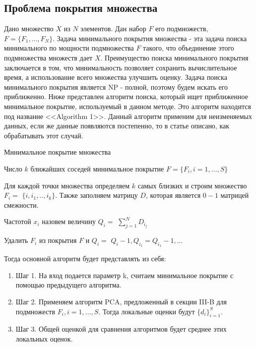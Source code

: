 \documentclass[english, russian]{sobraep}
\begin{document}
\subsection{Проблема покрытия множества}

Дано множество $X$ из $N$ элементов. Дан набор $F$ его подмножеств, $F = \{F_1, ..., F_N\}$. Задача минимального покрытия множества - эта задача поиска минимального по мощности подмножества $F$ такого, что объединение этого подмножества множеств дает $X$.
Преимущество поиска минимального покрытия заключается в том, что минимальность позволяет сохранить вычислительное время, а использование всего множества улучшить оценку. Задача поиска минимального покрытия является NP - полной, поэтому будем искать его приближенно. 
Ниже представлен алгоритм поиска, который ищет приближенное минимальное покрытие, используемый в данном методе. Это алгоритм находится под название <<Algorithm 1>>. Данный алгоритм применим для неизменяемых данных, если же данные появляются постепенно, то в статье описано, как обрабатывать этот случай. 

\begin{algorithm}
\caption{Минимальное покрытие множества}\label{alg:cap}
\begin{algorithmic}
\Require Число $k$ ближайших соседей
\Ensure минимальное покрытие $F = \{F_i, i = 1, ..., S\}$

    \State Для каждой точки множества определяем $k$ 
    \State самых близких и строим множество $F_i =$ 
    \State $\{i, i_1, .., i_k\}$.  Также заполняем 
    \State матрицу $D$, которая является $0-1$ матрицей
    \State смежности.
\EndFor

    \State Частотой $x_i$ назовем величину $Q_i = $
    \State $\sum_{j=1}^N D_i_j$
\EndFor

        \State Удалить $F_i$ из покрытия $F$ и $Q_i = $
        \State $Q_i - 1, Q_i_1 = Q_i_1 - 1, ...$    
    \EndIf
\EndFor

\end{algorithmic}
\end{algorithm}

Тогда основной алгоритм будет представлять из себя: 
\begin{enumerate}
    \item Шаг 1. На вход подается параметр k, считаем минимальное покрытие с помощью предыдущего алгоритма. 
    \item Шаг 2. Применяем алгоритм PCA, предложенный в секции III-B для подмножеств $F_i, i = 1, ..., S$. Тогда локальные оценки будут $\{d_i\}_{i=1}^S$. 
    \item Шаг 3. Общей оценкой для сравнения алгоритмов будет среднее этих локальных оценок. 
\end{enumerate}
\end{document}
